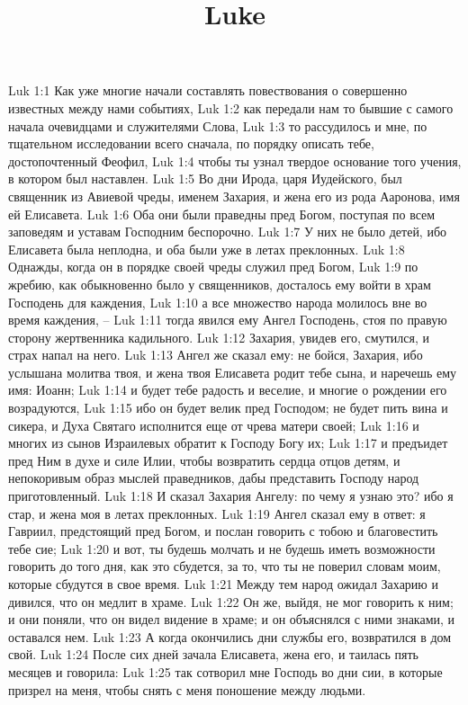 

\title{Luke}

Luk 1:1  Как уже многие начали составлять повествования о совершенно известных между нами событиях,
Luk 1:2  как передали нам то бывшие с самого начала очевидцами и служителями Слова,
Luk 1:3  то рассудилось и мне, по тщательном исследовании всего сначала, по порядку описать тебе, достопочтенный Феофил,
Luk 1:4  чтобы ты узнал твердое основание того учения, в котором был наставлен.
Luk 1:5  Во дни Ирода, царя Иудейского, был священник из Авиевой чреды, именем Захария, и жена его из рода Ааронова, имя ей Елисавета.
Luk 1:6  Оба они были праведны пред Богом, поступая по всем заповедям и уставам Господним беспорочно.
Luk 1:7  У них не было детей, ибо Елисавета была неплодна, и оба были уже в летах преклонных.
Luk 1:8  Однажды, когда он в порядке своей чреды служил пред Богом,
Luk 1:9  по жребию, как обыкновенно было у священников, досталось ему войти в храм Господень для каждения,
Luk 1:10  а все множество народа молилось вне во время каждения, --
Luk 1:11  тогда явился ему Ангел Господень, стоя по правую сторону жертвенника кадильного.
Luk 1:12  Захария, увидев его, смутился, и страх напал на него.
Luk 1:13  Ангел же сказал ему: не бойся, Захария, ибо услышана молитва твоя, и жена твоя Елисавета родит тебе сына, и наречешь ему имя: Иоанн;
Luk 1:14  и будет тебе радость и веселие, и многие о рождении его возрадуются,
Luk 1:15  ибо он будет велик пред Господом; не будет пить вина и сикера, и Духа Святаго исполнится еще от чрева матери своей;
Luk 1:16  и многих из сынов Израилевых обратит к Господу Богу их;
Luk 1:17  и предъидет пред Ним в духе и силе Илии, чтобы возвратить сердца отцов детям, и непокоривым образ мыслей праведников, дабы представить Господу народ приготовленный.
Luk 1:18  И сказал Захария Ангелу: по чему я узнаю это? ибо я стар, и жена моя в летах преклонных.
Luk 1:19  Ангел сказал ему в ответ: я Гавриил, предстоящий пред Богом, и послан говорить с тобою и благовестить тебе сие;
Luk 1:20  и вот, ты будешь молчать и не будешь иметь возможности говорить до того дня, как это сбудется, за то, что ты не поверил словам моим, которые сбудутся в свое время.
Luk 1:21  Между тем народ ожидал Захарию и дивился, что он медлит в храме.
Luk 1:22  Он же, выйдя, не мог говорить к ним; и они поняли, что он видел видение в храме; и он объяснялся с ними знаками, и оставался нем.
Luk 1:23  А когда окончились дни службы его, возвратился в дом свой.
Luk 1:24  После сих дней зачала Елисавета, жена его, и таилась пять месяцев и говорила:
Luk 1:25  так сотворил мне Господь во дни сии, в которые призрел на меня, чтобы снять с меня поношение между людьми.
